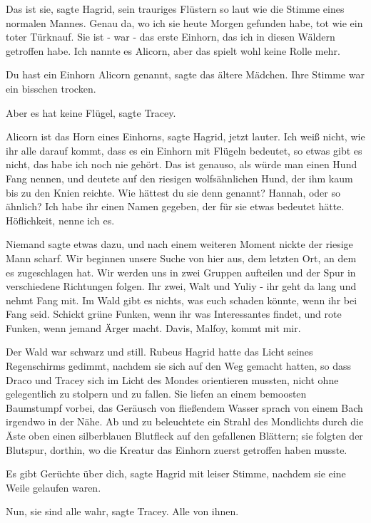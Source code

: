 \glqq Das ist sie\grqq{}, sagte Hagrid, sein trauriges Flüstern so laut wie die
Stimme eines normalen Mannes. \glqq Genau da, wo ich sie heute Morgen
gefunden habe, tot wie ein toter Türknauf. Sie ist - war - das erste
Einhorn, das ich in diesen Wäldern getroffen habe. Ich nannte es Alicorn,
aber das spielt wohl keine Rolle mehr.\grqq{}

\glqq Du hast ein Einhorn Alicorn genannt\grqq{}, sagte das ältere Mädchen. Ihre
Stimme war ein bisschen trocken.

\glqq Aber es hat keine Flügel\grqq{}, sagte Tracey.

\glqq Alicorn ist das Horn eines Einhorns\grqq{}, sagte Hagrid, jetzt lauter.
\glqq Ich weiß nicht, wie ihr alle darauf kommt, dass es ein Einhorn mit
Flügeln bedeutet, so etwas gibt es nicht, das habe ich noch nie gehört.
Das ist genauso, als würde man einen Hund Fang nennen\grqq{}, und deutete
auf den riesigen wolfsähnlichen Hund, der ihm kaum bis zu den Knien
reichte. \glqq Wie hättest du sie denn genannt? Hannah, oder so ähnlich?
Ich habe ihr einen Namen gegeben, der für sie etwas bedeutet hätte.
Höflichkeit, nenne ich es.\grqq{}

Niemand sagte etwas dazu, und nach einem weiteren Moment nickte der riesige Mann
scharf. \glqq Wir beginnen unsere Suche von hier aus, dem letzten Ort, an
dem es zugeschlagen hat. Wir werden uns in zwei Gruppen aufteilen und der
Spur in verschiedene Richtungen folgen. Ihr zwei, Walt und Yuliy - ihr
geht da lang und nehmt Fang mit. Im Wald gibt es nichts, was euch schaden
könnte, wenn ihr bei Fang seid. Schickt grüne Funken, wenn ihr was
Interessantes findet, und rote Funken, wenn jemand Ärger macht. Davis,
Malfoy, kommt mit mir.\grqq{}

Der Wald war schwarz und still. Rubeus Hagrid hatte das Licht seines
Regenschirms gedimmt, nachdem sie sich auf den Weg gemacht hatten, so
dass Draco und Tracey sich im Licht des Mondes orientieren mussten, nicht
ohne gelegentlich zu stolpern und zu fallen. Sie liefen an einem
bemoosten Baumstumpf vorbei, das Geräusch von fließendem Wasser sprach
von einem Bach irgendwo in der Nähe. Ab und zu beleuchtete ein Strahl des
Mondlichts durch die Äste oben einen silberblauen Blutfleck auf den
gefallenen Blättern; sie folgten der Blutspur, dorthin, wo die Kreatur
das Einhorn zuerst getroffen haben musste.

\glqq Es gibt Gerüchte über dich\grqq{}, sagte Hagrid mit leiser Stimme, nachdem
sie eine Weile gelaufen waren.

\glqq Nun, sie sind alle wahr\grqq{}, sagte Tracey. \glqq Alle von ihnen.\grqq{}


